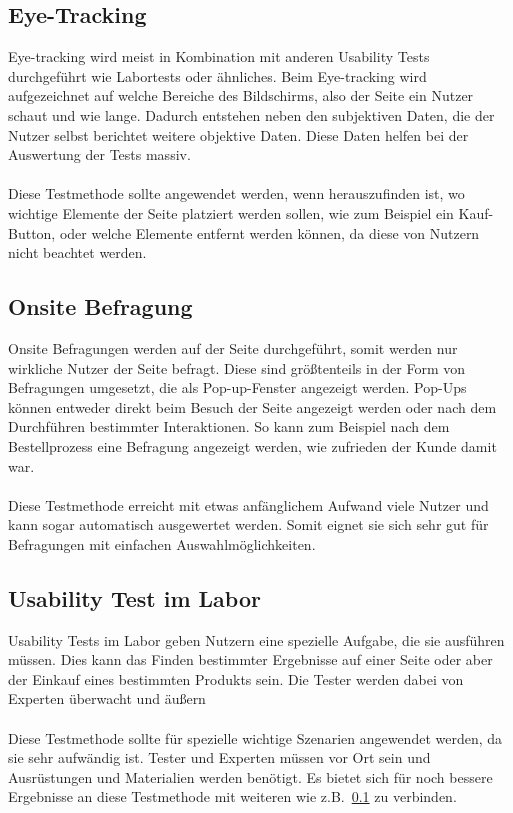 \subsection{Eye-Tracking}\label{subsec:eyetracking}
Eye-tracking wird meist in Kombination mit anderen Usability Tests durchgeführt wie Labortests oder ähnliches.
Beim Eye-tracking wird aufgezeichnet auf welche Bereiche des Bildschirms, also der Seite ein Nutzer schaut und wie lange.
Dadurch entstehen neben den subjektiven Daten, die der Nutzer selbst berichtet weitere objektive Daten.
Diese Daten helfen bei der Auswertung der Tests massiv.\\\\
Diese Testmethode sollte angewendet werden, wenn herauszufinden ist, wo wichtige Elemente der Seite platziert werden sollen, wie zum Beispiel ein Kauf-Button,
oder welche Elemente entfernt werden können, da diese von Nutzern nicht beachtet werden.\autocite[vgl.~][]{usability.de.eyetracking}

\subsection{Onsite Befragung}\label{subsec:onsite-befragung}
Onsite Befragungen werden auf der Seite durchgeführt, somit werden nur wirkliche Nutzer der Seite befragt.
Diese sind größtenteils in der Form von Befragungen umgesetzt, die als Pop-up-Fenster angezeigt werden.
Pop-Ups können entweder direkt beim Besuch der Seite angezeigt werden oder nach dem Durchführen bestimmter Interaktionen.
So kann zum Beispiel nach dem Bestellprozess eine Befragung angezeigt werden, wie zufrieden der Kunde damit war.\autocite[vgl.~][]{usability.de.methods}\\\\
Diese Testmethode erreicht mit etwas anfänglichem Aufwand viele Nutzer und kann sogar automatisch ausgewertet werden.
Somit eignet sie sich sehr gut für Befragungen mit einfachen Auswahlmöglichkeiten.\autocite[vgl.~][]{usability.de.onsite}

\subsection{Usability Test im Labor}\label{subsec:usability-test-im-labor}
Usability Tests im Labor geben Nutzern eine spezielle Aufgabe, die sie ausführen müssen.
Dies kann das Finden bestimmter Ergebnisse auf einer Seite oder aber der Einkauf eines bestimmten Produkts sein.
Die Tester werden dabei von Experten überwacht und äußern \autocite{mso.usability}\\\\
Diese Testmethode sollte für spezielle wichtige Szenarien angewendet werden, da sie sehr aufwändig ist.
Tester und Experten müssen vor Ort sein und Ausrüstungen und Materialien werden benötigt.
Es bietet sich für noch bessere Ergebnisse an diese Testmethode mit weiteren wie z.B.~\ref{subsec:eyetracking} zu verbinden.
